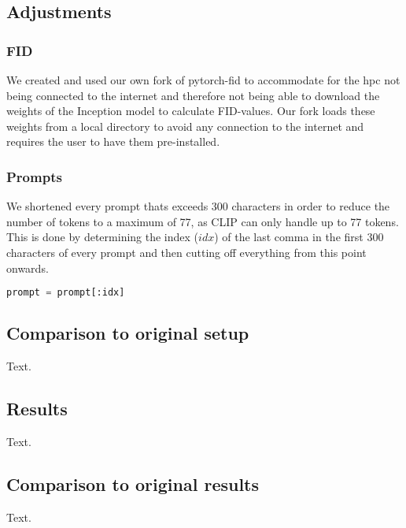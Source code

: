 \subsection{Adjustments}
\subsubsection*{FID}
We created and used our own fork of pytorch-fid\cite{Seitzer2020FID} to accommodate for the hpc not being connected to the internet and therefore not being able to download the weights of the Inception model to calculate FID-values. Our fork loads these weights from a local directory to avoid any connection to the internet and requires the user to have them pre-installed.

\subsubsection*{Prompts}
We shortened every prompt thats exceeds 300 characters in order to reduce the number of tokens to a maximum of 77, as CLIP\cite{radford2021learning} can only handle up to 77 tokens.\\
This is done by determining the index (\(idx\)) of the last comma in the first 300 characters of every prompt and then cutting off everything from this point onwards.
\begin{lstlisting}[language=Python]
prompt = prompt[:idx]
\end{lstlisting}

\subsection{Comparison to original setup}
Text.

\subsection{Results}
Text.

\subsection{Comparison to original results}
Text.